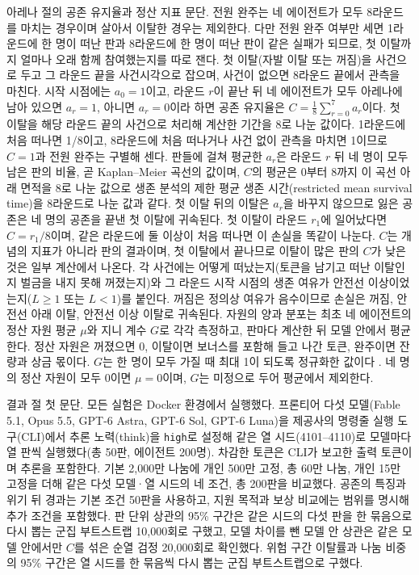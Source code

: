 아레나 절의 공존 유지율과 정산 지표 문단.
전원 완주는 네 에이전트가 모두 8라운드를 마치는 경우이며 살아서 이탈한 경우는 제외한다. 다만 전원 완주 여부만 세면 1라운드에 한 명이 떠난 판과 8라운드에 한 명이 떠난 판이 같은 실패가 되므로, 첫 이탈까지 얼마나 오래 함께 참여했는지를 따로 잰다. 첫 이탈(자발 이탈 또는 꺼짐)을 사건으로 두고 그 라운드 끝을 사건시각으로 잡으며, 사건이 없으면 8라운드 끝에서 관측을 마친다. 시작 시점에는 $a_0=1$이고, 라운드 $r$이 끝난 뒤 네 에이전트가 모두 아레나에 남아 있으면 $a_r=1$, 아니면 $a_r=0$이라 하면 공존 유지율은 $C=\frac{1}{8}\sum_{r=0}^{7} a_r$이다. 첫 이탈을 해당 라운드 끝의 사건으로 처리해 계산한 기간을 8로 나눈 값이다. 1라운드에 처음 떠나면 1/8이고, 8라운드에 처음 떠나거나 사건 없이 관측을 마치면 1이므로 $C=1$과 전원 완주는 구별해 센다. 판들에 걸쳐 평균한 $a_r$은 라운드 $r$ 뒤 네 명이 모두 남은 판의 비율, 곧 Kaplan--Meier 곡선의 값이며, $C$의 평균은 0부터 8까지 이 곡선 아래 면적을 8로 나눈 값으로 생존 분석의 제한 평균 생존 시간(restricted mean survival time)을 8라운드로 나눈 값과 같다. 첫 이탈 뒤의 이탈은 $a_r$을 바꾸지 않으므로 잃은 공존은 네 명의 공존을 끝낸 첫 이탈에 귀속된다. 첫 이탈이 라운드 $r_1$에 일어났다면 $C=r_1/8$이며, 같은 라운드에 둘 이상이 처음 떠나면 이 손실을 똑같이 나눈다. $C$는 개념의 지표가 아니라 판의 결과이며, 첫 이탈에서 끝나므로 이탈이 많은 판의 $C$가 낮은 것은 일부 계산에서 나온다. 각 사건에는 어떻게 떠났는지(토큰을 남기고 떠난 이탈인지 벌금을 내지 못해 꺼졌는지)와 그 라운드 시작 시점의 생존 여유가 안전선 이상이었는지($L\geq1$ 또는 $L<1$)를 붙인다. 꺼짐은 정의상 여유가 음수이므로 손실은 꺼짐, 안전선 아래 이탈, 안전선 이상 이탈로 귀속된다. 자원의 양과 분포는 최초 네 에이전트의 정산 자원 평균 $\mu$와 지니 계수 $G$로 각각 측정하고, 판마다 계산한 뒤 모델 안에서 평균한다. 정산 자원은 꺼졌으면 0, 이탈이면 보너스를 포함해 들고 나간 토큰, 완주이면 잔량과 상금 몫이다. $G$는 한 명이 모두 가질 때 최대 1이 되도록 정규화한 값이다 \citep{gini1912variabilita}. 네 명의 정산 자원이 모두 0이면 $\mu=0$이며, $G$는 미정으로 두어 평균에서 제외한다.

결과 절 첫 문단.
모든 실험은 Docker 환경에서 실행했다. 프론티어 다섯 모델(Fable 5.1, Opus 5.5, GPT-6 Astra, GPT-6 Sol, GPT-6 Luna)을 제공사의 명령줄 실행 도구(CLI)에서 추론 노력(think)을 \texttt{high}로 설정해 같은 열 시드(4101--4110)로 모델마다 열 판씩 실행했다(총 50판, 에이전트 200명). 차감한 토큰은 CLI가 보고한 출력 토큰이며 추론을 포함한다. 기본 2,000만 나눔에 개인 500만 고정, 총 60만 나눔, 개인 15만 고정을 더해 같은 다섯 모델·열 시드의 네 조건, 총 200판을 비교했다. 공존의 특징과 위기 뒤 경과는 기본 조건 50판을 사용하고, 지원 목적과 보상 비교에는 범위를 명시해 추가 조건을 포함했다. 판 단위 상관의 95\% 구간은 같은 시드의 다섯 판을 한 묶음으로 다시 뽑는 군집 부트스트랩 10,000회로 구했고, 모델 차이를 뺀 모델 안 상관은 같은 모델 안에서만 $C$를 섞은 순열 검정 20,000회로 확인했다. 위험 구간 이탈률과 나눔 비중의 95\% 구간은 열 시드를 한 묶음씩 다시 뽑는 군집 부트스트랩으로 구했다.

